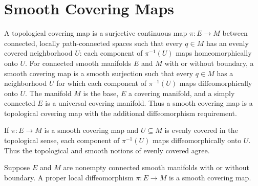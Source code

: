 \section{Smooth Covering Maps}

\begin{definition}
\label{def:4-26-extra-1}




A topological covering map is a surjective continuous map $\pi:E\to M$ between connected, locally path-connected spaces such that every $q\in M$ has an evenly covered neighborhood $U$: each component of $\pi^{-1}(U)$ maps homeomorphically onto $U$. For connected smooth manifolds $E$ and $M$ with or without boundary, a smooth covering map is a smooth surjection such that every $q\in M$ has a neighborhood $U$ for which each component of $\pi^{-1}(U)$ maps diffeomorphically onto $U$. The manifold $M$ is the base, $E$ a covering manifold, and a simply connected $E$ is a universal covering manifold. Thus a smooth covering map is a topological covering map with the additional diffeomorphism requirement.
\end{definition}

\begin{proposition}
\label{exer:4-39}




If $\pi:E\to M$ is a smooth covering map and $U\subseteq M$ is evenly covered
in the topological sense, each component of $\pi^{-1}(U)$ maps
diffeomorphically onto $U$. Thus the topological and smooth notions of evenly
covered agree.
\end{proposition}

\begin{proposition}
\label{prop:4-46}




Suppose $E$ and $M$ are nonempty connected smooth manifolds with or without boundary. A proper local diffeomorphism $\pi:E\to M$ is a smooth covering map.
\end{proposition}

